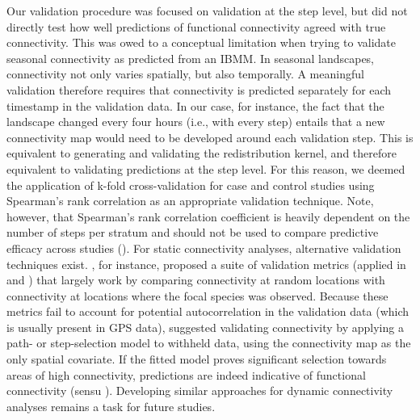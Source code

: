 \documentclass[../FinalThesis.tex]{subfiles}
\begin{document}
Our validation procedure was focused on validation at the step level, but did
not directly test how well predictions of functional connectivity agreed with
true connectivity. This was owed to a conceptual limitation when trying to
validate seasonal connectivity as predicted from an IBMM. In seasonal
landscapes, connectivity not only varies spatially, but also temporally. A
meaningful validation therefore requires that connectivity is predicted
separately for each timestamp in the validation data. In our case, for instance,
the fact that the landscape changed every four hours (i.e., with every step)
entails that a new connectivity map would need to be developed around each
validation step. This is equivalent to generating and validating the
redistribution kernel, and therefore equivalent to validating predictions at the
step level. For this reason, we deemed the application of k-fold
cross-validation for case and control studies using Spearman's rank correlation
as an appropriate validation technique. Note, however, that Spearman's rank
correlation coefficient is heavily dependent on the number of steps per stratum
and should not be used to compare predictive efficacy across studies
(). For static connectivity analyses,
alternative validation techniques exist. \citet{McClure.2016}, for instance,
proposed a suite of validation metrics (applied in \citealp{Zeller.2018} and
\citealp{Finerty.2023}) that largely work by comparing connectivity at random
locations with connectivity at locations where the focal species was observed.
Because these metrics fail to account for potential autocorrelation in the
validation data (which is usually present in GPS data), \citet{Brennan.2020}
suggested validating connectivity by applying a path- or step-selection model to
withheld data, using the connectivity map as the only spatial covariate. If the
fitted model proves significant selection towards areas of high connectivity,
predictions are indeed indicative of functional connectivity (sensu
\citealp{Brennan.2020}). Developing similar approaches for dynamic connectivity
analyses remains a task for future studies.


\end{document}
